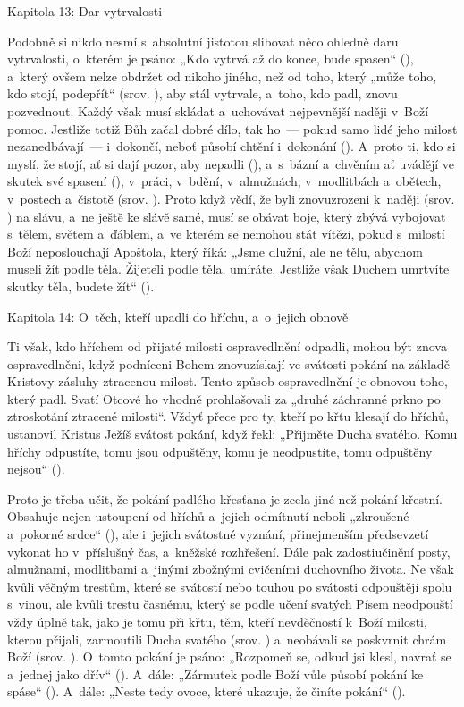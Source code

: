 \chaptitle
Kapitola 13:
Dar vytrvalosti

Podobně si nikdo nesmí s~absolutní jistotou slibovat něco ohledně daru vytrvalosti,
o~kterém je psáno: „Kdo vytrvá až do konce, bude spasen“ (), a~který
ovšem nelze obdržet od nikoho jiného, než od toho, který „může toho, kdo stojí, podepřít“
(srov. ), aby stál vytrvale, a~toho, kdo padl, znovu pozvednout. Každý však
musí skládat a~uchovávat nejpevnější naději v~Boží pomoc. Jestliže totiž Bůh začal
dobré dílo, tak ho~— pokud samo lidé jeho milost nezanedbávají~— i~dokončí, neboť
působí chtění i~dokonání (). A~proto ti, kdo si myslí, že stojí, ať si dají
pozor, aby nepadli (), a~s~bázní a~chvěním ať uvádějí ve skutek své spasení
(), v~práci, v~bdění, v~almužnách, v~modlitbách a~obětech, v~postech a~čistotě
(srov. ). Proto když vědí, že byli znovuzrozeni k~naději (srov. ) na slávu, a~ne ještě ke slávě samé, musí se obávat boje, který zbývá vybojovat
s~tělem, světem a~ďáblem, a~ve kterém se nemohou stát vítězi, pokud s~milostí Boží
neposlouchají Apoštola, který říká: „Jsme dlužní, ale ne tělu, abychom museli žít
podle těla. Žijete\=li podle těla, umíráte. Jestliže však Duchem umrtvíte skutky těla,
budete žít“ ().

\chaptitle
Kapitola 14:
O~těch, kteří upadli do hříchu, a~o~jejich obnově

Ti však, kdo hříchem od přijaté milosti ospravedlnění odpadli, mohou být znova ospravedlněni,
když podníceni Bohem znovuzískají ve svátosti pokání na základě Kristovy zásluhy
ztracenou milost. Tento způsob ospravedlnění je obnovou toho, který padl. Svatí Otcové
ho vhodně prohlašovali za „druhé záchranné prkno po ztroskotání ztracené milosti“.
Vždyť přece pro ty, kteří po křtu klesají do hříchů, ustanovil Kristus Ježíš svátost
pokání, když řekl: „Přijměte Ducha svatého. Komu hříchy odpustíte, tomu jsou odpuštěny,
komu je neodpustíte, tomu odpuštěny nejsou“ ().

Proto je třeba učit, že pokání padlého křesťana je zcela jiné než pokání křestní.
Obsahuje nejen ustoupení od hříchů a~jejich odmítnutí neboli „zkroušené a~pokorné
srdce“ (), ale i~jejich svátostné vyznání, přinejmenším předsevzetí vykonat
ho v~příslušný čas, a~kněžské rozhřešení. Dále pak zadostiučinění posty, almužnami,
modlitbami a~jinými zbožnými cvičeními duchovního života. Ne však kvůli věčným trestům,
které se svátostí nebo touhou po svátosti odpouštějí spolu s~vinou, ale kvůli trestu
časnému, který se podle učení svatých Písem neodpouští vždy úplně tak, jako je tomu
při křtu, těm, kteří nevděčností k~Boží milosti, kterou přijali, zarmoutili Ducha
svatého (srov. ) a~neobávali se poskvrnit chrám Boží (srov. ).
O~tomto pokání je psáno: „Rozpomeň se, odkud jsi klesl, navrať se a~jednej jako dřív“
(). A~dále: „Zármutek podle Boží vůle působí pokání ke spáse“ ().
A~dále: „Neste tedy ovoce, které ukazuje, že činíte pokání“ ().

